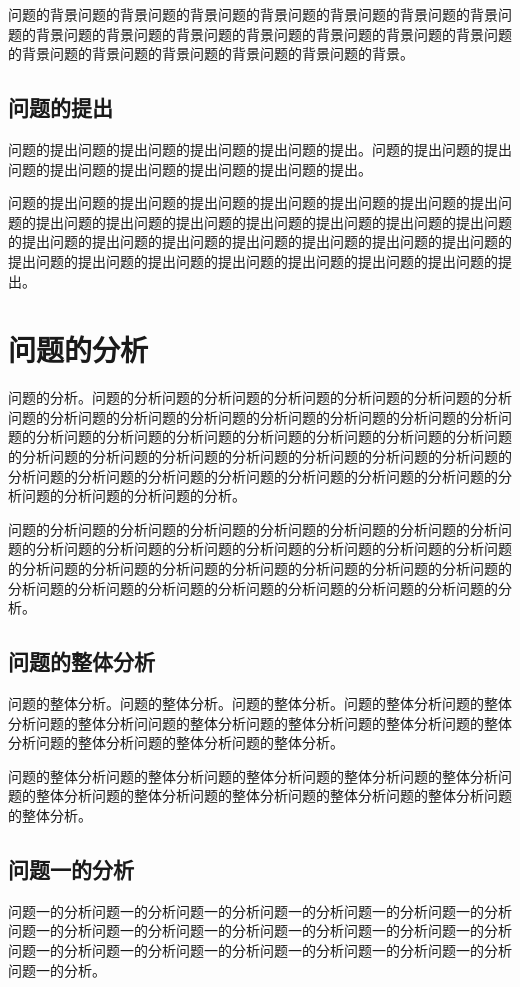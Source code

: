 \documentclass{MMCStyle}
\begin{document}
问题的背景问题的背景问题的背景问题的背景问题的背景问题的背景问题的背景问题的背景问题的背景问题的背景问题的背景问题的背景问题的背景问题的背景问题的背景问题的背景问题的背景问题的背景问题的背景问题的背景。
	\subsection{问题的提出}
问题的提出问题的提出问题的提出问题的提出问题的提出。问题的提出问题的提出问题的提出问题的提出问题的提出问题的提出问题的提出。

问题的提出问题的提出问题的提出问题的提出问题的提出问题的提出问题的提出问题的提出问题的提出问题的提出问题的提出问题的提出问题的提出问题的提出问题的提出问题的提出问题的提出问题的提出问题的提出问题的提出问题的提出问题的提出问题的提出问题的提出问题的提出问题的提出问题的提出问题的提出问题的提出。

	\section{问题的分析}
问题的分析。问题的分析问题的分析问题的分析问题的分析问题的分析问题的分析问题的分析问题的分析问题的分析问题的分析问题的分析问题的分析问题的分析问题的分析问题的分析问题的分析问题的分析问题的分析问题的分析问题的分析问题的分析问题的分析问题的分析问题的分析问题的分析问题的分析问题的分析问题的分析问题的分析问题的分析问题的分析问题的分析问题的分析问题的分析问题的分析问题的分析问题的分析问题的分析。

问题的分析问题的分析问题的分析问题的分析问题的分析问题的分析问题的分析问题的分析问题的分析问题的分析问题的分析问题的分析问题的分析问题的分析问题的分析问题的分析问题的分析问题的分析问题的分析问题的分析问题的分析问题的分析问题的分析问题的分析问题的分析问题的分析问题的分析问题的分析问题的分析。

	\subsection{问题的整体分析}
问题的整体分析。问题的整体分析。问题的整体分析。问题的整体分析问题的整体分析问题的整体分析问问题的整体分析问题的整体分析问题的整体分析问题的整体分析问题的整体分析问题的整体分析问题的整体分析。

问题的整体分析问题的整体分析问题的整体分析问题的整体分析问题的整体分析问题的整体分析问题的整体分析问题的整体分析问题的整体分析问题的整体分析问题的整体分析。
	\subsection{问题一的分析}
问题一的分析问题一的分析问题一的分析问题一的分析问题一的分析问题一的分析问题一的分析问题一的分析问题一的分析问题一的分析问题一的分析问题一的分析问题一的分析问题一的分析问题一的分析问题一的分析问题一的分析问题一的分析问题一的分析。
\end{document}
